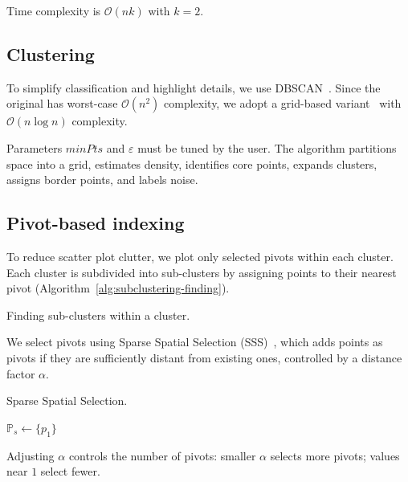 Time complexity is $\mathcal{O}(nk)$ with $k=2$.

\subsection{Clustering}
\label{subsect:clustering}

To simplify classification and highlight details, we use DBSCAN~\cite{ester1996}. Since the original has worst-case $\mathcal{O}(n^2)$ complexity, we adopt a grid-based variant~\cite{gunawan2013} with $\mathcal{O}(n \log n)$ complexity.

Parameters $minPts$ and $\varepsilon$ must be tuned by the user. The algorithm partitions space into a grid, estimates density, identifies core points, expands clusters, assigns border points, and labels noise.

\subsection{Pivot-based indexing}
\label{subsect:pivot-based-indexing}

To reduce scatter plot clutter, we plot only selected pivots within each cluster. Each cluster is subdivided into sub-clusters by assigning points to their nearest pivot (Algorithm~\ref{alg:subclustering-finding}).

\begin{algorithm}
    \caption{Finding sub-clusters within a cluster.}
    \label{alg:subclustering-finding}
\end{algorithm}

We select pivots using Sparse Spatial Selection (SSS)~\cite{pedreira2007}, which adds points as pivots if they are sufficiently distant from existing ones, controlled by a distance factor $\alpha$.

\begin{algorithm}
    \caption{Sparse Spatial Selection.}
    \label{alg:sss}
    $\mathbb{P}_s \gets \{p_1\}$ \\
\end{algorithm}

Adjusting $\alpha$ controls the number of pivots: smaller $\alpha$ selects more pivots; values near $1$ select fewer.

